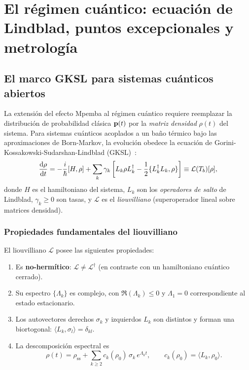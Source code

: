 \chapter{El régimen cuántico: ecuación de Lindblad, puntos excepcionales y metrología}
\label{ch:cuantico}

\section{El marco GKSL para sistemas cuánticos abiertos}

La extensión del efecto Mpemba al régimen cuántico requiere reemplazar la 
distribución de probabilidad clásica $\vb{p}(t)$ por la \emph{matriz densidad} 
$\rho(t)$ del sistema. Para sistemas cuánticos acoplados a un baño térmico bajo 
las aproximaciones de Born-Markov, la evolución obedece la ecuación de 
Gorini-Kossakowski-Sudarshan-Lindblad (GKSL)~\cite{breuer2002}:
\begin{equation}
    \dv{\rho}{t} = -\frac{i}{\hbar}[H, \rho] + \sum_{k} \gamma_{k} 
    \left[L_{k} \rho L_{k}^{\dagger} - \frac{1}{2}\{L_{k}^{\dagger} L_{k}, \rho\}\right] 
    \equiv \mathcal{L}(T_{b})[\rho],
    \label{eq:lindblad}
\end{equation}
%
donde $H$ es el hamiltoniano del sistema, $L_{k}$ son los \emph{operadores de 
salto} de Lindblad, $\gamma_{k} \geq 0$ son tasas, y $\mathcal{L}$ es el 
\emph{liouvilliano} (superoperador lineal sobre matrices densidad).

\subsection{Propiedades fundamentales del liouvilliano}

El liouvilliano $\mathcal{L}$ posee las siguientes propiedades:

\begin{enumerate}
\item Es \textbf{no-hermítico}: $\mathcal{L} \neq \mathcal{L}^{\dagger}$ 
(en contraste con un hamiltoniano cuántico cerrado).
\item Su espectro $\{\Lambda_{k}\}$ es complejo, con $\Re(\Lambda_{k}) \leq 0$ y 
$\Lambda_{1} = 0$ correspondiente al estado estacionario.
\item Los autovectores derechos $\sigma_{k}$ y izquierdos $L_{k}$ son distintos 
y forman una biortogonal: $\langle L_{k}, \sigma_{l} \rangle = \delta_{kl}$.
\item La descomposición espectral es
\begin{equation}
    \rho(t) = \rho_{\mathrm{ss}} + \sum_{k \geq 2} c_{k}(\rho_{0}) \, \sigma_{k} \, e^{\Lambda_{k} t},
    \qquad c_{k}(\rho_{0}) = \langle L_{k}, \rho_{0} \rangle.
    \label{eq:liouville_spectrum}
\end{equation}
\end{enumerate}

